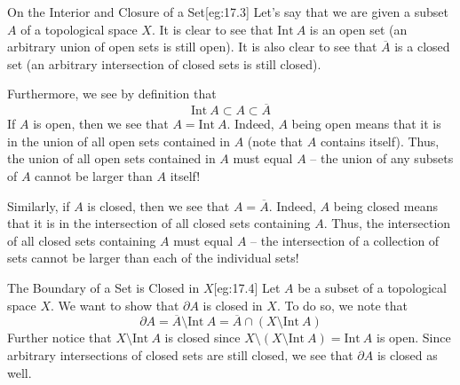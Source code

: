 \begin{egBox}{On the Interior and Closure of a Set}[eg:17.3]
    Let's say that we are given a subset \( A \) of a topological space \( X \).
    It is clear to see that \( \mathrm{Int} \ A \) is an open set (an arbitrary
    union of open sets is still open).
    It is also clear to see that \( \overline{ A } \) is a closed set (an 
    arbitrary intersection of closed sets is still closed).

    \baseSkip

    Furthermore, we see by definition that 
    \begin{equation*}
        \mathrm{Int} \ A \subset A \subset \overline{ A }
    \end{equation*}
    If \( A \) is open, then we see that \( A = \mathrm{Int} \ A \).
    Indeed, 
    \( A \) being open means that it is in the union of all open sets contained 
    in \( A \) (note that \( A \) contains itself).
    Thus, the union of all open sets contained in \( A \) must equal \( A \)
    -- the union of any subsets of \( A \) cannot be larger than \( A \) itself!
    
    \baseSkip 
    
    Similarly, if \( A \) is closed, then we see that \( A = \overline{ A } \).
    Indeed, \( A \) being closed means that it is in the intersection of all 
    closed sets containing \( A \).
    Thus, the intersection of all closed sets containing \( A \) must equal 
    \( A \) -- the intersection of a collection of sets cannot be larger than 
    each of the individual sets!
\end{egBox}

\begin{egBox}{The Boundary of a Set is Closed in \( X \)}[eg:17.4]
    Let \( A \) be a subset of a topological space \( X \).
    We want to show that \( \partial A \) is closed in \( X \).
    To do so, we note that
    \begin{equation*}
        \partial A 
        =
        \overline{ A } \setminus \mathrm{Int} \ A
        =
        \overline{ A } \cap ( X \setminus \mathrm{Int} \ A )
    \end{equation*}
    Further notice that \( X \setminus \mathrm{Int} \ A \) is closed since 
    \( X \setminus ( X \setminus \mathrm{Int} \ A ) = \mathrm{Int} \ A \) is 
    open.
    Since arbitrary intersections of closed sets are still closed, we see that 
    \( \partial A \) is closed as well.
\end{egBox}

